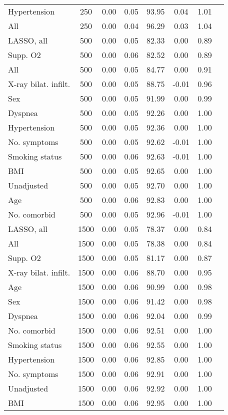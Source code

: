 \documentclass{article}
\begin{document}
{\begin{longtable}{lccccccc}
Hypertension & 250 & 0.00 & 0.05 &  93.95 &  0.04 & 1.01 \\ 
All & 250 & 0.00 & 0.04 &  96.29 &  0.03 & 1.04 \\ \midrule 
LASSO, all & 500 & 0.00 & 0.05 &  82.33 &  0.00 & 0.89 \\ 
Supp. O2 & 500 & 0.00 & 0.06 &  82.52 &  0.00 & 0.89 \\ 
All & 500 & 0.00 & 0.05 &  84.77 &  0.00 & 0.91 \\ 
X-ray bilat. infilt. & 500 & 0.00 & 0.05 &  88.75 & -0.01 & 0.96 \\ 
Sex & 500 & 0.00 & 0.05 &  91.99 &  0.00 & 0.99 \\ 
Dyspnea & 500 & 0.00 & 0.05 &  92.26 &  0.00 & 1.00 \\ 
Hypertension & 500 & 0.00 & 0.05 &  92.36 &  0.00 & 1.00 \\ 
No. symptoms & 500 & 0.00 & 0.05 &  92.62 & -0.01 & 1.00 \\ 
Smoking status & 500 & 0.00 & 0.06 &  92.63 & -0.01 & 1.00 \\ 
BMI & 500 & 0.00 & 0.05 &  92.65 &  0.00 & 1.00 \\ 
Unadjusted & 500 & 0.00 & 0.05 &  92.70 &  0.00 & 1.00 \\ 
Age & 500 & 0.00 & 0.06 &  92.83 &  0.00 & 1.00 \\ 
No. comorbid & 500 & 0.00 & 0.05 &  92.96 & -0.01 & 1.00 \\ \midrule 
LASSO, all & 1500 & 0.00 & 0.05 &  78.37 &  0.00 & 0.84 \\ 
All & 1500 & 0.00 & 0.05 &  78.38 &  0.00 & 0.84 \\ 
Supp. O2 & 1500 & 0.00 & 0.05 &  81.17 &  0.00 & 0.87 \\ 
X-ray bilat. infilt. & 1500 & 0.00 & 0.06 &  88.70 &  0.00 & 0.95 \\ 
Age & 1500 & 0.00 & 0.06 &  90.99 &  0.00 & 0.98 \\ 
Sex & 1500 & 0.00 & 0.06 &  91.42 &  0.00 & 0.98 \\ 
Dyspnea & 1500 & 0.00 & 0.06 &  92.04 &  0.00 & 0.99 \\ 
No. comorbid & 1500 & 0.00 & 0.06 &  92.51 &  0.00 & 1.00 \\ 
Smoking status & 1500 & 0.00 & 0.06 &  92.55 &  0.00 & 1.00 \\ 
Hypertension & 1500 & 0.00 & 0.06 &  92.85 &  0.00 & 1.00 \\ 
No. symptoms & 1500 & 0.00 & 0.06 &  92.91 &  0.00 & 1.00 \\ 
Unadjusted & 1500 & 0.00 & 0.06 &  92.92 &  0.00 & 1.00 \\ 
BMI & 1500 & 0.00 & 0.06 &  92.95 &  0.00 & 1.00 \\
\bottomrule
\hline
\end{longtable}
}
\end{document}
